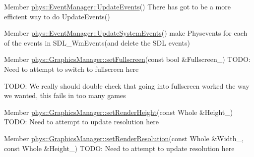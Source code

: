 \label{dd/da0/todo__todo000006}
\hypertarget{dd/da0/todo__todo000006}{}
 
\begin{DoxyDescription}
\item[Member \hyperlink{classphys_1_1EventManager_a63cf23dc9fe0ced3e2c60ca61c97b166}{phys::EventManager::UpdateEvents}() ]There has got to be a more efficient way to do UpdateEvents() 
\end{DoxyDescription}

\label{dd/da0/todo__todo000007}
\hypertarget{dd/da0/todo__todo000007}{}
 
\begin{DoxyDescription}
\item[Member \hyperlink{classphys_1_1EventManager_a0cf574c55def063d66d7db46a4d3e8a5}{phys::EventManager::UpdateSystemEvents}() ]make Physevents for each of the events in SDL\_\-WmEvents(and delete the SDL events) 
\end{DoxyDescription}

\label{dd/da0/todo__todo000010}
\hypertarget{dd/da0/todo__todo000010}{}
 
\begin{DoxyDescription}
\item[Member \hyperlink{classphys_1_1GraphicsManager_aafcf1824190e44d42a9bfbea9cfbe1b2}{phys::GraphicsManager::setFullscreen}(const bool \&Fullscreen\_\-) ]TODO: Need to attempt to switch to fullscreen here 

TODO: We really should double check that going into fullscreen worked the way we wanted, this fails in too many games 
\end{DoxyDescription}

\label{dd/da0/todo__todo000012}
\hypertarget{dd/da0/todo__todo000012}{}
 
\begin{DoxyDescription}
\item[Member \hyperlink{classphys_1_1GraphicsManager_a8d59e9a8aa2ae7f520d388a4c70f0623}{phys::GraphicsManager::setRenderHeight}(const Whole \&Height\_\-) ]TODO: Need to attempt to update resolution here 
\end{DoxyDescription}

\label{dd/da0/todo__todo000014}
\hypertarget{dd/da0/todo__todo000014}{}
 
\begin{DoxyDescription}
\item[Member \hyperlink{classphys_1_1GraphicsManager_ac6feb044d9ab394f3e65d51026a899a6}{phys::GraphicsManager::setRenderResolution}(const Whole \&Width\_\-, const Whole \&Height\_\-) ]TODO: Need to attempt to update resolution here 
\end{DoxyDescription}

